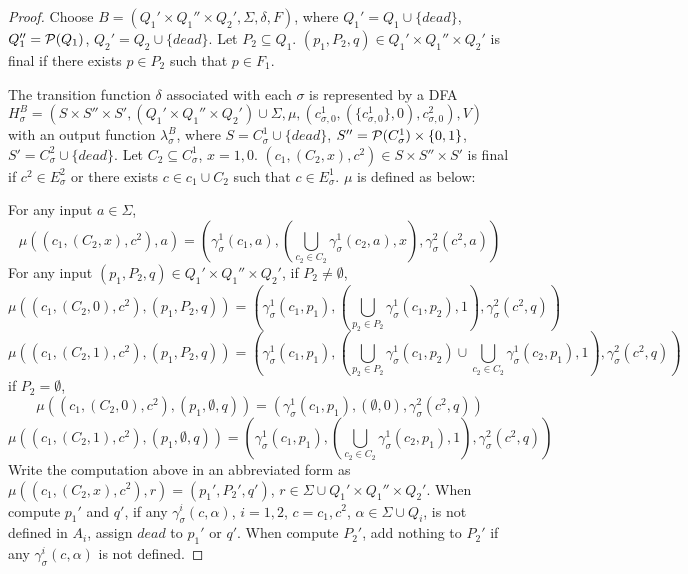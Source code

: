 \documentclass[copyright]{eptcs}
\begin{document}
\begin{proof}
Choose $B = (Q_1' \times Q_1'' \times Q_2', \Sigma, \delta, F)$,
where $Q_1'= Q_1 \cup \{dead\} $, $Q_1''= {\cal P} (Q_1) $, $Q_2'
= Q_2 \cup \{ dead\}$. Let $P_2 \subseteq Q_1 $. $( p_1 , P_2
,q)\in Q_1' \times Q_1'' \times Q_2'$ is final if there exists
$p\in P_2$ such that $p\in F_1$.

The transition function $\delta$ associated with each $\sigma$ is
represented by a DFA $H_{\sigma}^{B}=(  S \times S'' \times S',
(Q_1' \times Q_1'' \times Q_2') \cup \Sigma, \mu, ( c_{\sigma,0}^1
, ( \{ c_{\sigma,0}^1 \} , 0) ,c_{\sigma,0}^2), V)$ with an output
function $\lambda_\sigma^{B}$, where $S = C_{\sigma}^1 \cup
\{dead\} $, $S'' =  {\cal P} ( C_{\sigma}^1 ) \times \{ 0 ,1 \} $,
$S' = C_{\sigma}^2 \cup \{dead\} $. Let $C_2\subseteq
C_{\sigma}^1$, $x=1,0$. $( c_1 ,( C_2 , x ) , c^2) \in S \times
S'' \times S'$ is final if $c^2 \in E_{\sigma}^2$ or there exists
$c \in c_1 \cup C_2$ such that $c \in E_{\sigma}^1$. $\mu$ is
defined as below:

For any input $a\in \Sigma$,
$$
\mu(( c_1 , ( C_2 , x) ,c^2), a) = ( \gamma_\sigma^1(c_1, a),
(\bigcup_{c_2\in C_2} \gamma_\sigma^1(c_2, a), x),
\gamma_\sigma^2(c^2, a))
$$
For any input $( p_1 , P_2  ,q)\in Q_1' \times Q_1'' \times Q_2'
$, if $P_2 \neq \emptyset$,
$$
\mu(( c_1 , ( C_2 , 0) , c^2), ( p_1 , P_2  ,q) ) = (
\gamma_\sigma^1(c_1, p_1), (\bigcup_{p_2\in P_2}
\gamma_\sigma^1(c_1, p_2) , 1), \gamma_\sigma^2(c^2, q))
$$
$$
\mu((  c_1 , ( C_2 , 1) , c^2), ( p_1 , P_2  ,q) ) = (
\gamma_\sigma^1(c_1, p_1), ( \bigcup_{p_2\in
P_2}\gamma_\sigma^1(c_1, p_2) \cup \bigcup_{c_2\in C_2}
\gamma_\sigma^1(c_2, p_1) , 1), \gamma_\sigma^2(c^2, q))
$$
if $P_2 = \emptyset$,
$$
\mu(( c_1 , ( C_2 , 0) , c^2), ( p_1 , \emptyset  ,q) ) = (
\gamma_\sigma^1(c_1, p_1), ( \emptyset , 0), \gamma_\sigma^2(c^2,
q))
$$
$$
\mu((  c_1 , ( C_2 , 1) , c^2), ( p_1 , \emptyset  ,q) ) = (
\gamma_\sigma^1(c_1, p_1), (\bigcup_{c_2\in C_2}
\gamma_\sigma^1(c_2, p_1) , 1), \gamma_\sigma^2(c^2, q))
$$
Write the computation above in an abbreviated form as $\mu((  c_1
, ( C_2 , x) , c^2), r ) = ( p_1' , P_2'  ,q' )$, $r\in \Sigma\cup
Q_1'\times Q_1''\times Q_2'$. When compute $p_1'$ and $q'$, if any
$\gamma_\sigma^i (c, \alpha)$, $i=1,2$, $c=c_1,c^2$, $\alpha \in
\Sigma \cup Q_i $, is not defined in $A_i$, assign $dead$ to
$p_1'$ or $q'$. When compute $P_2'$, add nothing to $P_2'$ if any
$\gamma_\sigma^i (c, \alpha)$ is not defined.


\end{proof}
\end{document}
